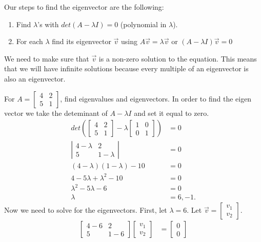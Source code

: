 Our steps to find the eigenvector are the following:
\begin{enumerate}
  \item Find $\lambda$'s with $det(A-\lambda I)=0$ (polynomial in $\lambda$).
  \item For each $\lambda$ find its eigenvector $\vec{v}$ using $A\vec{v}=\lambda\vec{v}$ or $(A-\lambda I)\vec{v}=0$
\end{enumerate}
We need to make sure that $\vec{v}$ is a non-zero solution to the equation. This means that we will have infinite solutions because every multiple of an eigenvector is also an eigenvector.
\begin{eg}
  For $A=\begin{bmatrix} 4&2\\5&1 \end{bmatrix}$, find eigenvalues and eigenvectors. In order to find the eigen vector we take the deteminant of $A-\lambda I$ and set it equal to zero.
  \begin{align*}
    det(\begin{bmatrix} 4&2\\5&1 \end{bmatrix} -\lambda\begin{bmatrix} 1&0\\0&1 \end{bmatrix} )&=0\\
    \left| \begin{matrix} 4-\lambda&2\\5&1-\lambda \end{matrix} \right| &=0\\
    (4-\lambda)(1-\lambda)-10&=0\\
    4-5\lambda+\lambda^2-10&=0\\
    \lambda^2-5\lambda-6&=0\\
    \lambda&=6,-1
  .\end{align*}
  Now we need to solve for the eigenvectors. First, let $\lambda=6$. Let $\vec{v}=\begin{bmatrix} v_1\\v_2 \end{bmatrix}$.
  \begin{align*}
    \begin{bmatrix} 4-6&2\\5&1-6 \end{bmatrix} \begin{bmatrix} v_1\\v_2 \end{bmatrix} &=\begin{bmatrix} 0\\0 \end{bmatrix} \\

\end{align*}
\end{eg}
